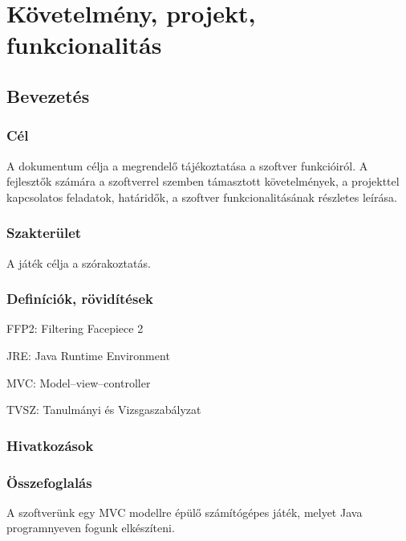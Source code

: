 \chapter{Követelmény, projekt, funkcionalitás}

\section{Bevezetés}

\subsection{Cél}
A dokumentum célja a megrendelő tájékoztatása a szoftver funkcióiról.
A fejlesztők számára a szoftverrel szemben támasztott követelmények, a projekttel kapcsolatos feladatok, határidők, a szoftver funkcionalitásának részletes leírása.

\subsection{Szakterület}
A játék célja a szórakoztatás.

\subsection{Definíciók, rövidítések}

\begin{rov}
FFP2:  Filtering Facepiece 2
\end{rov}
\begin{rov}
JRE: Java Runtime Environment
\end{rov}
\begin{rov}
MVC: Model–view–controller
\end{rov}
\begin{rov}
TVSZ: Tanulmányi és Vizsgaszabályzat
\end{rov}

\subsection{Hivatkozások}

\subsection{Összefoglalás}
A szoftverünk egy MVC modellre épülő számítógépes játék, melyet Java programnyeven fogunk elkészíteni.

